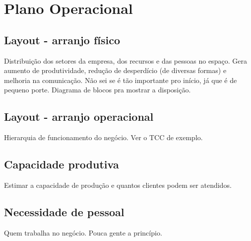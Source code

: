 \section{Plano Operacional}

\subsection{Layout - arranjo físico}

Distribuição dos setores da empresa, dos recursos e das pessoas no espaço.
Gera aumento de produtividade, redução de desperdício (de diversas formas) e melhoria
na comunicação. Não sei se é tão importante pro início, já que é de pequeno porte.
Diagrama de blocos pra mostrar a disposição.

\subsection{Layout - arranjo operacional}

Hierarquia de funcionamento do negócio. Ver o TCC de exemplo.

\subsection{Capacidade produtiva}

Estimar a capacidade de produção e quantos clientes podem ser atendidos.

\subsection{Necessidade de pessoal}

Quem trabalha no negócio. Pouca gente a princípio.

